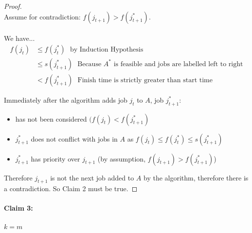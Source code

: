 \documentclass[12pt]{article}
\begin{document}
\begin{proof}
\\
Assume for contradiction: $f(j_{t+1}) > f(j_{t+1}^*)$.\\
\\
We have... 
\begin{align*}
	f(j_t) &\leq f(j_t^*)\:\:\:\text{by Induction Hypothesis}\\
	&\leq s(j_{t+1}^*)\:\:\:\text{Because $A^*$ is feasible and jobs are labelled left to right}\\
	&< f(j_{t+1}^*)\:\:\:\text{Finish time is strictly greater than start time}
\end{align*}

Immediately after the algorithm adds job $j_t$ to $A$, job $j^*_{t+1}$:
\begin{itemize}
	\item{has not been considered $(f(j_t) < f(j^*_{t+1})$}
	\item{$j^*_{t+1}$ does not conflict with jobs in $A$ as $f(j_t) \leq f(j^*_t) \leq s(j_{t+1}^*)$}
	\item{$j^*_{t+1}$ has priority over $j_{t+1}$ (by assumption, $f(j_{t+1}) > f(j^*_{t+1})$)}
\end{itemize}

Therefore $j_{t+1}$ is not the next job added to $A$ by the algorithm, therefore there is a contradiction. So Claim 2 must be true.

\end{proof}

\paragraph{Claim 3:} $k=m$
\end{document}
